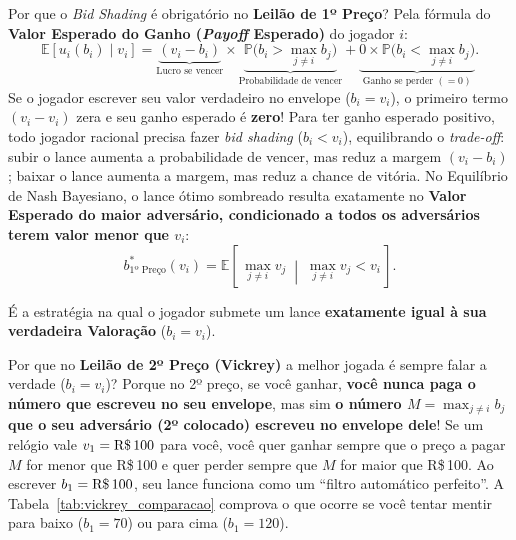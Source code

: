 Por que o \textit{Bid Shading} é obrigatório no \textbf{Leilão de 1º Preço}? Pela fórmula do \textbf{Valor Esperado do Ganho (\textit{Payoff} Esperado)} do jogador $i$:
\begin{equation}
\label{eq:payoff_esperado_1p}
\mathbb{E}[u_i(b_i) \mid v_i] = \underbrace{(v_i - b_i)}_{\text{Lucro se vencer}} \times \underbrace{\mathbb{P}\!\Big(b_i > \max_{j \neq i} b_j\Big)}_{\text{Probabilidade de vencer}} + \underbrace{0 \times \mathbb{P}\!\Big(b_i < \max_{j \neq i} b_j\Big)}_{\text{Ganho se perder } (=0)}.
\end{equation}
Se o jogador escrever seu valor verdadeiro no envelope ($b_i = v_i$), o primeiro termo $(v_i - v_i)$ zera e seu ganho esperado é \textbf{zero}! Para ter ganho esperado positivo, todo jogador racional precisa fazer \textit{bid shading} ($b_i < v_i$), equilibrando o \textit{trade-off}: subir o lance aumenta a probabilidade de vencer, mas reduz a margem $(v_i - b_i)$; baixar o lance aumenta a margem, mas reduz a chance de vitória. No Equilíbrio de Nash Bayesiano, o lance ótimo sombreado resulta exatamente no \textbf{Valor Esperado do maior adversário, condicionado a todos os adversários terem valor menor que $v_i$}:
\begin{equation}
\label{eq:lance_otimo_1p_esperanca}
b_{\text{1º Preço}}^*(v_i) = \mathbb{E}\!\left[\, \max_{j \neq i} v_j \;\middle|\; \max_{j \neq i} v_j < v_i \,\right].
\end{equation}

\begin{definicao}
\label{def:truthful_bidding}
É a estratégia na qual o jogador submete um lance \textbf{exatamente igual à sua verdadeira Valoração} ($b_i = v_i$).
\end{definicao}

Por que no \textbf{Leilão de 2º Preço (Vickrey)} a melhor jogada é sempre falar a verdade ($b_i = v_i$)? Porque no 2º preço, se você ganhar, \textbf{você nunca paga o número que escreveu no seu envelope}, mas sim \textbf{o número $M = \max_{j \neq i} b_j$ que o seu adversário (2º colocado) escreveu no envelope dele}! Se um relógio vale $v_1 = \text{R\$\,100}$ para você, você quer ganhar sempre que o preço a pagar $M$ for menor que R\$\,100 e quer perder sempre que $M$ for maior que R\$\,100. Ao escrever $b_1 = \text{R\$\,100}$, seu lance funciona como um ``filtro automático perfeito''. A Tabela~\ref{tab:vickrey_comparacao} comprova o que ocorre se você tentar mentir para baixo ($b_1 = 70$) ou para cima ($b_1 = 120$).

